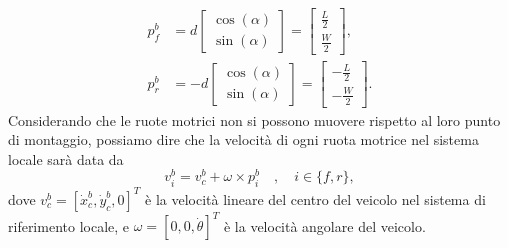 \begin{align}
    p_f^b & = d\begin{bmatrix}
                   \cos(\alpha) \\
                   \sin(\alpha)
               \end{bmatrix} = \begin{bmatrix}
                                   \frac{L}{2} \\
                                   \frac{W}{2}
                               \end{bmatrix},  \label{eq:pfb} \\
    p_r^b & = -d\begin{bmatrix}
                    \cos(\alpha) \\
                    \sin(\alpha)
                \end{bmatrix} = \begin{bmatrix}
                                    -\frac{L}{2} \\
                                    -\frac{W}{2}
                                \end{bmatrix}. \label{eq:prb}
\end{align}
Considerando che le ruote motrici non si possono muovere rispetto al loro punto di montaggio, possiamo dire che la velocità di ogni ruota motrice nel sistema locale sarà data da
\begin{equation}\label{eq:wheel_vel_general}
    v_i^b = v_c^b + \omega \times p_i^b \quad , \quad i \in \{f,r\},
\end{equation}
dove $v_c^b = [\dot{x}_c^b, \dot{y}_c^b,0]^T$ è la velocità lineare del centro del veicolo nel sistema di riferimento locale, e $\omega = [0, 0, \dot{\theta}]^T$ è la velocità angolare del veicolo.

